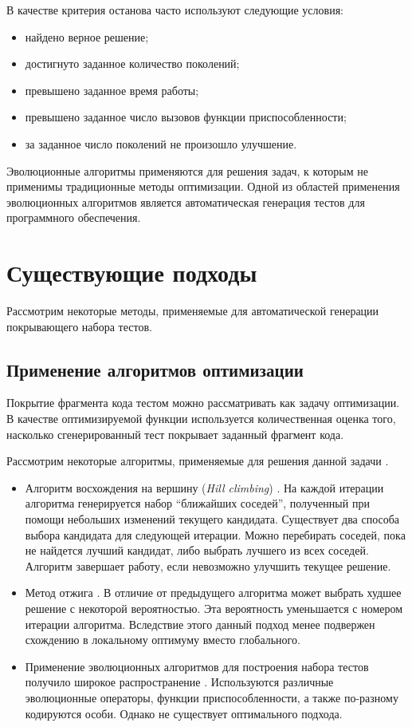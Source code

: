 В качестве критерия останова часто используют следующие условия:
\begin{itemize}
 \item найдено верное решение;
 \item достигнуто заданное количество поколений;
 \item превышено заданное время работы;
 \item превышено заданное число вызовов функции приспособленности;
 \item за заданное число поколений не произошло улучшение.
\end{itemize}

Эволюционные алгоритмы применяются для решения задач, к которым не применимы традиционные методы оптимизации. Одной из областей применения эволюционных 
алгоритмов является автоматическая генерация тестов для программного обеспечения.

\section{Существующие подходы}
Рассмотрим некоторые методы, применяемые для автоматической генерации покрывающего набора тестов.

\subsection{Применение алгоритмов оптимизации}
Покрытие фрагмента кода тестом можно рассматривать как задачу оптимизации. В качестве оптимизируемой функции используется количественная оценка того, насколько 
сгенерированный тест покрывает заданный фрагмент кода.

Рассмотрим некоторые алгоритмы, применяемые для решения данной задачи \cite{review_harman,sbst}.
\begin{itemize}
 \item Алгоритм восхождения на вершину (\textit{Hill climbing}) \cite{hill_climbing_harman}. На каждой итерации алгоритма генерируется 
набор ``ближайших соседей'', полученный при помощи небольших изменений текущего кандидата. Существует два способа выбора кандидата для следующей итерации. Можно 
перебирать соседей, пока не найдется лучший кандидат, либо выбрать лучшего из всех соседей. Алгоритм завершает работу, если невозможно улучшить текущее 
решение. 
 \item Метод отжига \cite{SA}. В отличие от предыдущего алгоритма может выбрать худшее решение с некоторой вероятностью. Эта вероятность уменьшается с номером 
итерации алгоритма. Вследствие этого данный подход менее подвержен схождению в локальному оптимуму вместо глобального.

 \item Применение эволюционных алгоритмов для построения набора тестов получило широкое распространение 
\cite{evolutionary_tonella,whole_test_suite_generation,structural_test_data_generation}. Используются различные эволюционные операторы, функции 
приспособленности, а также по-разному кодируются особи. Однако не существует оптимального подхода.
\end{itemize}


